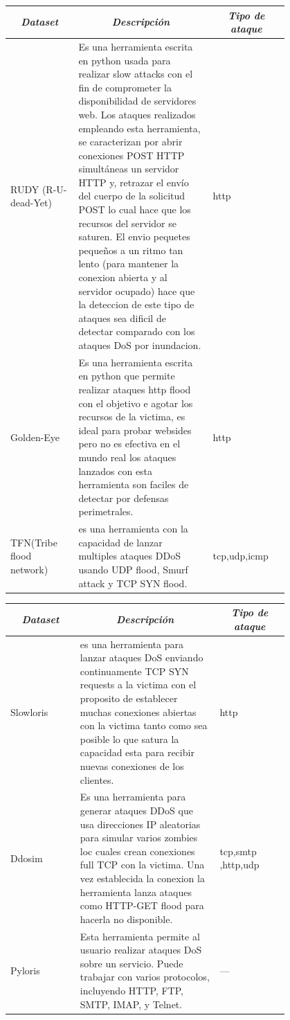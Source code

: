 \documentclass[12pt]{article}
\begin{document}
\begin{table}[htbp]
\centering
\begin{tabular}{|p{0.2\linewidth}|p{0.4\linewidth}|p{0.2\linewidth}|}
\hline
\multicolumn{1}{|c|}{\textit{\textbf{Dataset}}} & \multicolumn{1}{c|}{\textit{\textbf{Descripción}}} & \multicolumn{1}{c|}{\textit{\textbf{Tipo de ataque}}} \tabularnewline \hline
RUDY (R-U-dead-Yet) & Es una herramienta escrita en python usada para realizar slow attacks con el fin de comprometer la disponibilidad de servidores web. Los ataques realizados empleando esta herramienta, se caracterizan por abrir conexiones POST HTTP simultáneas un servidor HTTP y, retrazar el envío del cuerpo de la solicitud POST lo cual hace que los recursos del servidor se saturen. El envio pequetes pequeños a un ritmo tan lento (para mantener la conexion abierta y al servidor ocupado) hace que la deteccion de este tipo de ataques sea dificil de detectar comparado con los ataques DoS por inundacion. & http \tabularnewline \hline
Golden-Eye & Es una herramienta escrita en python que permite realizar ataques http flood con el objetivo e agotar los recursos de la victima, es ideal para probar websides pero no es efectiva en el  mundo real los ataques lanzados con esta herramienta son faciles de detectar por defensas perimetrales.  & http \tabularnewline \hline
TFN(Tribe flood network) & es una herramienta con la capacidad de lanzar multiples ataques DDoS usando UDP flood, Smurf attack y TCP SYN flood. & tcp,udp,icmp \tabularnewline \hline
\end{tabular}
\end{table}

\begin{table}[htbp]
\centering
\begin{tabular}{|p{0.2\linewidth}|p{0.4\linewidth}|p{0.2\linewidth}|}
\hline
\multicolumn{1}{|c|}{\textit{\textbf{Dataset}}} & \multicolumn{1}{c|}{\textit{\textbf{Descripción}}} & \multicolumn{1}{c|}{\textit{\textbf{Tipo de ataque}}} \tabularnewline \hline
Slowloris & es una herramienta para lanzar ataques DoS enviando continuamente TCP SYN requests a la victima con el proposito de establecer muchas conexiones abiertas con la victima tanto como sea posible lo que satura la capacidad esta para recibir nuevas conexiones de los clientes. & http \tabularnewline \hline
Ddosim & Es una herramienta para generar ataques DDoS que usa direcciones IP aleatorias para simular varios zombies loc cuales crean conexiones full TCP con la victima. Una vez establecida la conexion la herramienta lanza ataques como HTTP-GET flood para hacerla no disponible. & tcp,smtp ,http,udp \tabularnewline \hline
Pyloris & Esta herramienta permite al usuario realizar ataques DoS sobre un servicio. Puede trabajar con varios protocolos, incluyendo HTTP, FTP, SMTP, IMAP, y Telnet. & --- \tabularnewline \hline
\end{tabular}
\end{table}
\end{document}
